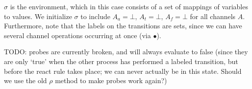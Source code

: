 \documentclass{article}
\begin{document}
$\sigma$ is the environment, which in this case consists of a set of mappings of variables to values.
We initialize $\sigma$ to include $A_a = \bot$, $A_t = \bot$, $A_f = \bot$ for all channels $A$.
Furthermore, note that the labels on the transitions are sets, since we can have several channel operations occurring at once (via $\bullet$).

TODO: probes are currently broken, and will always evaluate to false (since they are only `true' when the other process has performed a labeled transition, but before the react rule takes place; we can never actually be in this state. Should we use the old $\rho$ method to make probes work again?)
\end{document}
